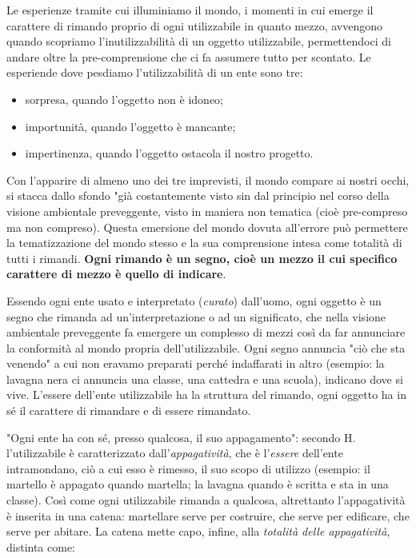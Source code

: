 \documentclass[a4paper,12pt,oneside]{article}%
\begin{document}
Le esperienze tramite cui illuminiamo il mondo, i momenti in cui emerge il carattere di rimando proprio di ogni utilizzabile in quanto mezzo, avvengono quando scopriamo l'inutilizzabilità di un oggetto utilizzabile, permettendoci di andare oltre la pre-comprensione che ci fa assumere tutto per scontato. Le esperiende dove pesdiamo l'utilizzabilità di un ente sono tre:

\begin{itemize}
	\item sorpresa, quando l'oggetto non è idoneo;
	\item importunità, quando l'oggetto è mancante;
	\item impertinenza, quando l'oggetto ostacola il nostro progetto.
\end{itemize}

Con l'apparire di almeno uno dei tre imprevisti, il mondo compare ai nostri occhi, si stacca dallo sfondo "già costantemente visto sin dal principio nel corso della visione ambientale preveggente, visto in maniera non tematica (cioè pre-compreso ma non compreso). Questa emersione del mondo dovuta all'errore può permettere la tematizzazione del mondo stesso e la sua comprensione intesa come totalità di tutti i rimandi. \textbf{Ogni rimando è un segno, cioè un mezzo il cui specifico carattere di mezzo è quello di indicare}. 

Essendo ogni ente usato e interpretato (\textit{curato}) dall'uomo, ogni oggetto è un segno che rimanda ad un'interpretazione o ad un significato, che nella visione ambientale preveggente fa emergere un complesso di mezzi così da far annunciare la conformità al mondo propria dell'utilizzabile. Ogni segno annuncia "ciò che sta venendo" a cui non eravamo preparati perché indaffarati in altro (esempio: la lavagna nera ci annuncia una classe, una cattedra e una scuola), indicano dove si vive.
L'essere dell'ente utilizzabile ha la struttura del rimando, ogni oggetto ha in sé il carattere di rimandare e di essere rimandato. 

"Ogni ente ha con sé, presso qualcosa, il suo appagamento": secondo H. l'utilizzabile è caratterizzato dall'\textit{appagatività}, che è l'\textit{essere} dell'ente intramondano, ciò a cui esso è rimesso, il suo scopo di utilizzo (esempio: il martello è appagato quando martella; la lavagna quando è scritta e sta in una classe). Così come ogni utilizzabile rimanda a qualcosa, altrettanto l'appagatività è inserita in una catena: martellare serve per costruire, che serve per edificare, che serve per abitare. La catena mette capo, infine, alla \textit{totalità delle appagatività}, distinta come:
\end{document}
